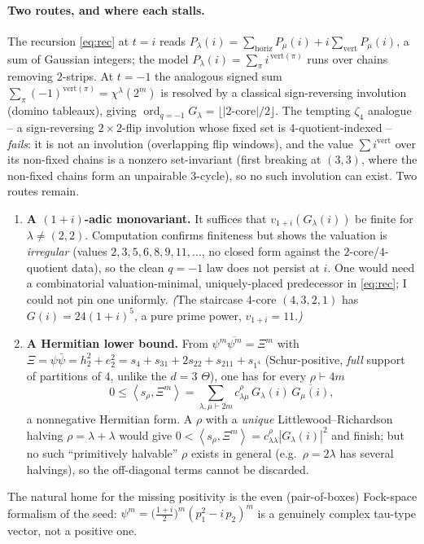 \documentclass[11pt]{article}
\theoremstyle{definition}
\theoremstyle{remark}
\DeclareMathOperator{\ord}{ord}
\newcommand{\la}{\lambda}
\newcommand{\inner}[1]{\left\langle #1 \right\rangle}
\begin{document}
\paragraph{Two routes, and where each stalls.} The recursion \eqref{eq:rec}
at $t=i$ reads $P_\la(i)=\sum_{\mathrm{horiz}}P_\mu(i)+i\sum_{\mathrm{vert}}P_\mu(i)$,
a sum of Gaussian integers; the model $P_\la(i)=\sum_{\pi}i^{\,\mathrm{vert}(\pi)}$
runs over chains removing $2$-strips. At $t=-1$ the analogous signed sum
$\sum_\pi(-1)^{\mathrm{vert}(\pi)}=\chi^\la(2^m)$ is resolved by a classical
sign-reversing involution (domino tableaux), giving
$\ord_{q=-1}G_\la=\lfloor|2\text{-core}|/2\rfloor$. The tempting $\zeta_4$ analogue --
a sign-reversing $2\times2$-flip involution whose fixed set is $4$-quotient-indexed --
\emph{fails}: it is not an involution (overlapping flip windows), and the value
$\sum i^{\mathrm{vert}}$ over its non-fixed chains is a nonzero set-invariant (first
breaking at $(3,3)$, where the non-fixed chains form an unpairable $3$-cycle), so no
such involution can exist. Two routes remain.
\begin{enumerate}
\item \textbf{A $(1+i)$-adic monovariant.} It suffices that $v_{1+i}(G_\la(i))$ be
finite for $\la\neq(2,2)$. Computation confirms finiteness but shows the valuation is
\emph{irregular} (values $2,3,5,6,8,9,11,\dots$, no closed form against the
$2$-core/$4$-quotient data), so the clean $q=-1$ law does not persist at $i$. One
would need a combinatorial valuation-minimal, uniquely-placed predecessor in
\eqref{eq:rec}; I could not pin one uniformly. \emph{(}The staircase $4$-core
$(4,3,2,1)$ has $G(i)=24(1+i)^5$, a pure prime power, $v_{1+i}=11$.\emph{)}
\item \textbf{A Hermitian lower bound.} From $\psi^m\overline{\psi^m}=\Xi^m$ with
$\Xi=\psi\bar\psi=h_2^2+e_2^2=s_4+s_{31}+2s_{22}+s_{211}+s_{1^4}$ (Schur-positive,
\emph{full} support of partitions of $4$, unlike the $d=3$ $\Theta$), one has for every
$\rho\vdash4m$
\[
   0\le\inner{s_\rho,\Xi^m}=\sum_{\la,\mu\vdash2m}c^{\rho}_{\la\mu}\,G_\la(i)\,\overline{G_\mu(i)},
\]
a nonnegative Hermitian form. A $\rho$ with a \emph{unique} Littlewood--Richardson
halving $\rho=\la+\la$ would give $0<\inner{s_\rho,\Xi^m}=c^{\rho}_{\la\la}|G_\la(i)|^2$
and finish; but no such ``primitively halvable'' $\rho$ exists in general (e.g.\
$\rho=2\la$ has several halvings), so the off-diagonal terms cannot be discarded.
\end{enumerate}
The natural home for the missing positivity is the even (pair-of-boxes) Fock-space
formalism of the seed: $\psi^m=\big(\tfrac{1+i}2\big)^m(p_1^2-i\,p_2)^m$ is a genuinely
complex tau-type vector, not a positive one.
\end{document}
